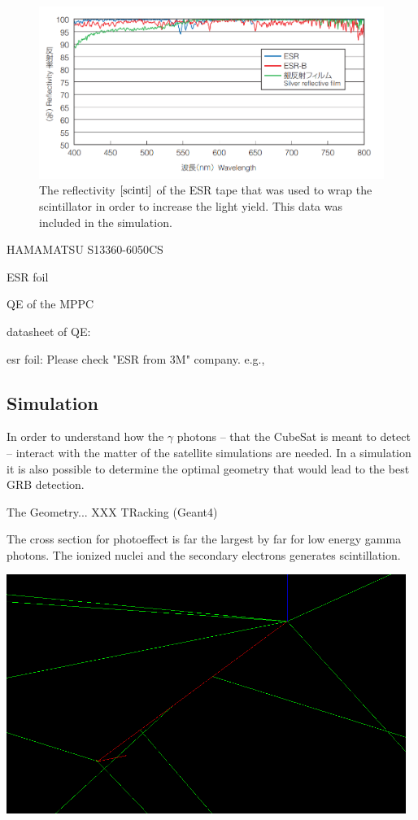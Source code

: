 \documentclass[12pt, a4paper,titlepage]{article}
\numberwithin{equation}{section}
\numberwithin{figure}{section}
\begin{document}
\begin{figure}[H]
\centering
\includegraphics[width=130.0mm]{images/reflectivity.png}
\caption{The reflectivity $\cite{scinti}$ of the ESR tape that was used to wrap the scintillator in order to increase the light yield. This data was included in the simulation.}
\end{figure}


HAMAMATSU S13360-6050CS

ESR foil

QE \cite{qe} of the MPPC


datasheet of QE:

esr \cite{esr} foil:
Please check "ESR from 3M" company. e.g.,



\subsection{Simulation}

In order to understand how the $\gamma$ photons -- that the CubeSat is meant to detect -- interact with the matter of the satellite simulations are needed. In a simulation it is also possible to determine the optimal geometry that would lead to the best GRB detection. 

The Geometry... XXX TRacking (Geant4) 


The cross section for photoeffect is far the largest by far for low energy gamma photons.
The ionized nuclei and the secondary electrons generates scintillation.

\includegraphics[width=130.0mm]{images/secondary.png}
\end{document}
